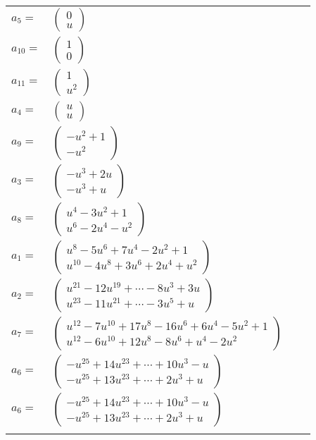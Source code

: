 \documentclass[1p]{elsarticle_modified}
\theoremstyle{definition}
\begin{document}
\begin{tabular}{m{7pt} m{180pt} m{7pt} m{180pt} }
\flushright $a_{5}=$&$\begin{pmatrix}0\\u\end{pmatrix}$ \\
\flushright $a_{10}=$&$\begin{pmatrix}1\\0\end{pmatrix}$ \\
\flushright $a_{11}=$&$\begin{pmatrix}1\\u^2\end{pmatrix}$ \\
\flushright $a_{4}=$&$\begin{pmatrix}u\\u\end{pmatrix}$ \\
\flushright $a_{9}=$&$\begin{pmatrix}- u^2+1\\- u^2\end{pmatrix}$ \\
\flushright $a_{3}=$&$\begin{pmatrix}- u^3+2 u\\- u^3+u\end{pmatrix}$ \\
\flushright $a_{8}=$&$\begin{pmatrix}u^4-3 u^2+1\\u^6-2 u^4- u^2\end{pmatrix}$ \\
\flushright $a_{1}=$&$\begin{pmatrix}u^8-5 u^6+7 u^4-2 u^2+1\\u^{10}-4 u^8+3 u^6+2 u^4+u^2\end{pmatrix}$ \\
\flushright $a_{2}=$&$\begin{pmatrix}u^{21}-12 u^{19}+\cdots-8 u^3+3 u\\u^{23}-11 u^{21}+\cdots-3 u^5+u\end{pmatrix}$ \\
\flushright $a_{7}=$&$\begin{pmatrix}u^{12}-7 u^{10}+17 u^8-16 u^6+6 u^4-5 u^2+1\\u^{12}-6 u^{10}+12 u^8-8 u^6+u^4-2 u^2\end{pmatrix}$ \\
\flushright $a_{6}=$&$\begin{pmatrix}- u^{25}+14 u^{23}+\cdots+10 u^3- u\\- u^{25}+13 u^{23}+\cdots+2 u^3+u\end{pmatrix}$\\ \flushright $a_{6}=$&$\begin{pmatrix}- u^{25}+14 u^{23}+\cdots+10 u^3- u\\- u^{25}+13 u^{23}+\cdots+2 u^3+u\end{pmatrix}$\\&\end{tabular}
\end{document}
